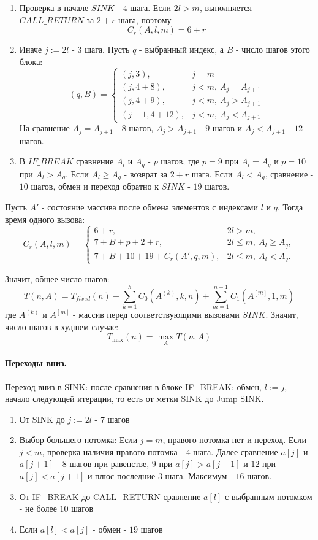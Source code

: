 \documentclass[12pt]{article}
\begin{document}
\begin{enumerate}
    \item Проверка в начале $SINK$ - $4$ шага. Если $2l>m$, выполняется $CALL\_RETURN$ за $2+r$ шага, поэтому
    \[
        C_r(A,l,m)=6+r
    \]
    \item Иначе $j:=2l$ - $3$ шага. Пусть $q$ - выбранный индекс, а $B$ - число шагов этого блока:
    \[
    (q,B)=
    \begin{cases}
        (j,3), & j=m\\
        (j,4+8), & j<m,\ A_j=A_{j+1}\\
        (j,4+9), & j<m,\ A_j>A_{j+1}\\
        (j+1,4+12), & j<m,\ A_j<A_{j+1}
    \end{cases}
    \]
    На сравнение $A_j=A_{j+1}$ - $8$ шагов, $A_j>A_{j+1}$ - $9$ шагов и $A_j<A_{j+1}$ - $12$ шагов.
    \item В $IF\_BREAK$ сравнение $A_l$ и $A_q$ - $p$ шагов, где $p=9$ при $A_l=A_q$ и $p=10$ при $A_l>A_q$. Если $A_l\geq A_q$ - возврат за $2+r$ шага. Если $A_l<A_q$, сравнение - $10$ шагов, обмен и переход обратно к $SINK$ - $19$ шагов.
\end{enumerate}

Пусть $A'$ - состояние массива после обмена элементов с индексами $l$ и $q$. Тогда время одного вызова:
\[
C_r(A,l,m)=
\begin{cases}
6+r, & 2l>m,\\
7+B+p+2+r, & 2l\leq m,\ A_l\geq A_q,\\
7+B+10+19+C_r(A',q,m), & 2l\leq m,\ A_l<A_q.
\end{cases}
\]

Значит, общее число шагов:
\[
T(n,A)=T_{fixed}(n)
+\sum_{k=1}^{h} C_0(A^{(k)},k,n)
+\sum_{m=1}^{n-1} C_1(A^{[m]},1,m)
\]
где $A^{(k)}$ и $A^{[m]}$ - массив перед соответствующими вызовами $SINK$. Значит, число шагов в худшем случае:
\[
    T_{\max}(n)=\max_A T(n,A)
\]

\paragraph{Переходы вниз.}

Переход вниз в SINK: после сравнения в блоке IF\_BREAK: обмен, $l:=j$, начало следующей итерации, то есть от метки SINK до Jump SINK.

\begin{enumerate}
    \item От SINK до $j:=2l$ - $7$ шагов
    \item Выбор большего потомка: Если $j=m$, правого потомка нет и переход. Если $j<m$, проверка наличия правого потомка - $4$ шага. Далее сравнение $a[j]$ и $a[j+1]$ - $8$ шагов при равенстве, $9$ при $a[j]>a[j+1]$ и $12$ при $a[j]<a[j+1]$ и плюс последние $3$ шага. Максимум - $16$ шагов.
    \item От IF\_BREAK до CALL\_RETURN сравнение $a[l]$ с выбранным потомком - не более $10$ шагов
    \item Если $a[l]<a[j]$ - обмен - $19$ шагов
\end{enumerate}
\end{document}
